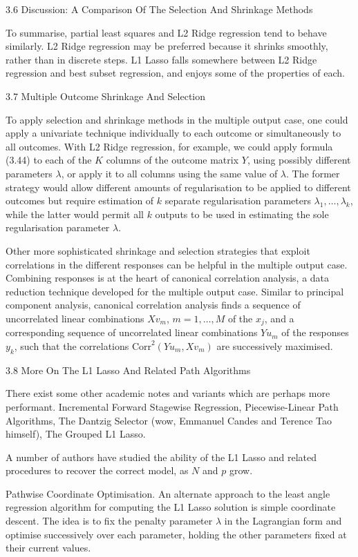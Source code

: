 3.6 Discussion: A Comparison Of The Selection And Shrinkage Methods

To summarise, partial least squares and L2 Ridge regression tend to behave similarly. L2 Ridge regression may be preferred because it shrinks smoothly, rather than in discrete steps. L1 Lasso falls somewhere between L2 Ridge regression and best subset regression, and enjoys some of the properties of each.

3.7 Multiple Outcome Shrinkage And Selection

To apply selection and shrinkage methods in the multiple output case,
one could apply a univariate technique individually to each outcome or simultaneously to all outcomes. With L2 Ridge regression, for example, we could apply formula (3.44) to each of the $K$ columns of the outcome matrix $Y$, using possibly different parameters $\lambda$, or apply it to all columns using the same value of $\lambda$. The former strategy would allow different amounts of regularisation to be applied to different outcomes but require estimation of $k$ separate regularisation parameters $\lambda_1, \dots, \lambda_k$, while the latter would permit all $k$ outputs to be used in estimating the sole regularisation parameter $\lambda$.

Other more sophisticated shrinkage and selection strategies that exploit correlations in the different responses can be helpful in the multiple output case. Combining responses is at the heart of canonical correlation analysis, a data reduction technique developed for the multiple output case. Similar to principal component analysis, canonical correlation analysis finds a sequence of uncorrelated linear combinations $Xv_m$, $m = 1, \dots, M$ of the $x_j$, and a corresponding sequence of uncorrelated linear combinations $Yu_m$ of the responses $y_k$, such that the correlations $\text{Corr}^2 (Yu_m, Xv_m)$ are successively maximised.

3.8 More On The L1 Lasso And Related Path Algorithms

There exist some other academic notes and variants which are perhaps more performant. Incremental Forward Stagewise Regression, Piecewise-Linear Path Algorithms, The Dantzig Selector (wow, Emmanuel Candes and Terence Tao himself), The Grouped L1 Lasso.

A number of authors have studied the ability of the L1 Lasso and related procedures to recover the correct model, as $N$ and $p$ grow.

Pathwise Coordinate Optimisation. An alternate approach to the least angle regression algorithm for computing the L1 Lasso solution is simple coordinate descent. The idea is to fix the penalty parameter $\lambda$ in the Lagrangian form and optimise successively over each parameter, holding the other parameters fixed at their current values.

